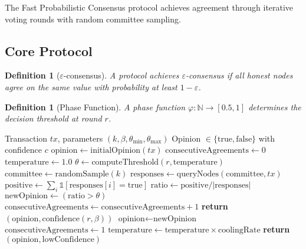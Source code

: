 \documentclass[11pt,a4paper]{article}
\newtheorem{definition}[theorem]{Definition}
\begin{document}
The Fast Probabilistic Consensus protocol achieves agreement through iterative voting rounds with random committee sampling.

\subsection{Core Protocol}

\begin{definition}[$\varepsilon$-consensus]
A protocol achieves $\varepsilon$-consensus if all honest nodes agree on the same value with probability at least $1 - \varepsilon$.
\end{definition}

\begin{definition}[Phase Function]
A phase function $\varphi: \mathbb{N} \to [0.5, 1]$ determines the decision threshold at round $r$.
\end{definition}

\begin{algorithm}
\caption{Fast Probabilistic Consensus}
\label{alg:fpc}
\begin{algorithmic}[1]
\REQUIRE Transaction $tx$, parameters $(k, \beta, \theta_{\min}, \theta_{\max})$
\ENSURE Opinion $\in \{\text{true}, \text{false}\}$ with confidence $c$
\STATE $\text{opinion} \gets \text{initialOpinion}(tx)$
\STATE $\text{consecutiveAgreements} \gets 0$
\STATE $\text{temperature} \gets 1.0$
    \STATE $\theta \gets \text{computeThreshold}(r, \text{temperature})$
    \STATE $\text{committee} \gets \text{randomSample}(k)$
    \STATE $\text{responses} \gets \text{queryNodes}(\text{committee}, tx)$
    \STATE $\text{positive} \gets \sum_{i} \mathbb{1}[\text{responses}[i] = \text{true}]$
    \STATE $\text{ratio} \gets \text{positive} / |\text{responses}|$
    \STATE $\text{newOpinion} \gets (\text{ratio} > \theta)$
        \STATE $\text{consecutiveAgreements} \gets \text{consecutiveAgreements} + 1$
            \STATE \textbf{return} $(\text{opinion}, \text{confidence}(r, \beta))$
        \ENDIF
    \ELSE
        \STATE $\text{opinion} \gets \text{newOpinion}$
        \STATE $\text{consecutiveAgreements} \gets 1$
    \ENDIF
    \STATE $\text{temperature} \gets \text{temperature} \times \text{coolingRate}$
\ENDFOR
\STATE \textbf{return} $(\text{opinion}, \text{lowConfidence})$
\end{algorithmic}
\end{algorithm}
\end{document}
